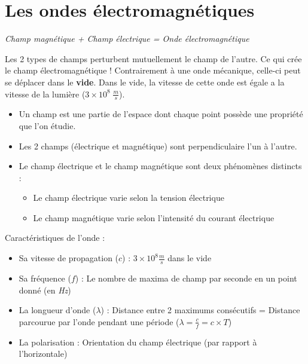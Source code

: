 \documentclass[a4paper]{article}
\begin{document}
\section{Les ondes électromagnétiques}
\begin{center} \textit{Champ magnétique + Champ électrique = Onde électromagnétique} \end{center}
Les 2 types de champs perturbent mutuellement le champ de l'autre. Ce qui crée le champ électromagnétique !
Contrairement à une onde mécanique, celle-ci peut se déplacer dans le \textbf{vide}. 
Dans le vide, la vitesse de cette onde est égale a la vitesse de la lumière ($3\times10^{8} \; \frac{m}{s}$).\\[0.2cm]
\begin{itemize}
  \item Un champ est une partie de l'espace dont chaque point possède une propriété que l'on étudie.
  \item Les 2 champs (électrique et magnétique) sont perpendiculaire l'un à l'autre.
  \item Le champ électrique et le champ magnétique sont deux phénomènes distincts :
  \begin{itemize}
    \item Le champ électrique varie selon la tension électrique
    \item Le champ magnétique varie selon l'intensité du courant électrique\\[0.2cm]
  \end{itemize}
  
\end{itemize}
\par
Caractéristiques de l'onde :
\begin{itemize}
  \item Sa vitesse de propagation ($c$) : $3\times10^{8}\frac{m}{s}$ dans le vide
  \item Sa fréquence ($f$) : Le nombre de maxima de champ par seconde en un point donné (en \emph{Hz})
  \item La longueur d'onde ($\lambda$) : Distance entre 2 maximums consécutifs = Distance parcourue par l'onde pendant une période ($\lambda = \frac{c}{f} = c \times T$)
  \item La polarisation : Orientation du champ électrique (par rapport à l'horizontale)\\[0.2cm]
\end{itemize}
\end{document}
